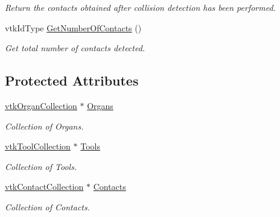 \begin{DoxyCompactItemize}
\begin{DoxyCompactList}\small\item\em Return the contacts obtained after collision detection has been performed. \item\end{DoxyCompactList}\item 
\hypertarget{classvtkCollisionDetectionLibrary_afd05001689b2ae40d13aa1c6fcdb4d47}{
vtkIdType \hyperlink{classvtkCollisionDetectionLibrary_afd05001689b2ae40d13aa1c6fcdb4d47}{GetNumberOfContacts} ()}
\label{classvtkCollisionDetectionLibrary_afd05001689b2ae40d13aa1c6fcdb4d47}

\begin{DoxyCompactList}\small\item\em Get total number of contacts detected. \item\end{DoxyCompactList}\end{DoxyCompactItemize}
\subsection*{Protected Attributes}
\begin{DoxyCompactItemize}
\item 
\hypertarget{classvtkCollisionDetectionLibrary_aee838a43b1b179dd1b76be2988ee3778}{
\hyperlink{classvtkOrganCollection}{vtkOrganCollection} $\ast$ \hyperlink{classvtkCollisionDetectionLibrary_aee838a43b1b179dd1b76be2988ee3778}{Organs}}
\label{classvtkCollisionDetectionLibrary_aee838a43b1b179dd1b76be2988ee3778}

\begin{DoxyCompactList}\small\item\em Collection of Organs. \item\end{DoxyCompactList}\item 
\hypertarget{classvtkCollisionDetectionLibrary_a02da266da879cea37a6974cc29ea1306}{
\hyperlink{classvtkToolCollection}{vtkToolCollection} $\ast$ \hyperlink{classvtkCollisionDetectionLibrary_a02da266da879cea37a6974cc29ea1306}{Tools}}
\label{classvtkCollisionDetectionLibrary_a02da266da879cea37a6974cc29ea1306}

\begin{DoxyCompactList}\small\item\em Collection of Tools. \item\end{DoxyCompactList}\item 
\hypertarget{classvtkCollisionDetectionLibrary_aca2cf2786e46292084f241754ba7722f}{
\hyperlink{classvtkContactCollection}{vtkContactCollection} $\ast$ \hyperlink{classvtkCollisionDetectionLibrary_aca2cf2786e46292084f241754ba7722f}{Contacts}}
\label{classvtkCollisionDetectionLibrary_aca2cf2786e46292084f241754ba7722f}

\begin{DoxyCompactList}\small\item\em Collection of Contacts. \item\end{DoxyCompactList}\end{DoxyCompactItemize}


